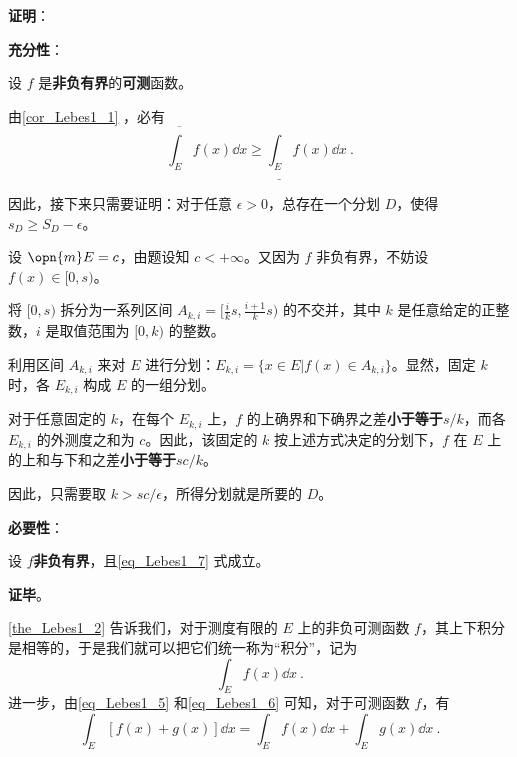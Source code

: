 \textbf{证明}：

\textbf{充分性}：

设 $f$ 是\textbf{非负有界}的\textbf{可测}函数。

由\autoref{cor_Lebes1_1} ，必有
\begin{equation}
\overline{\int_E} f(x) \dd x \geq \underline{\int_E} f(x) \dd x~.
\end{equation}

因此，接下来只需要证明：对于任意 $\epsilon>0$，总存在一个分划 $D$，使得 $s_D\geq S_D-\epsilon$。

设 $\opn{m}E=c$，由题设知 $c<+\infty$。又因为 $f$ 非负有界，不妨设 $f(x)\in [0, s)$。

将 $[0, s)$ 拆分为一系列区间 $A_{k, i}=[\frac{i}{k}s, \frac{i+1}{k}s)$ 的不交并，其中 $k$ 是任意给定的正整数，$i$ 是取值范围为 $[0, k)$ 的整数。

利用区间 $A_{k, i}$ 来对 $E$ 进行分划：$E_{k, i}=\{x\in E|f(x)\in A_{k, i}\}$。显然，固定 $k$ 时，各 $E_{k, i}$ 构成 $E$ 的一组分划。

对于任意固定的 $k$，在每个 $E_{k, i}$ 上，$f$ 的上确界和下确界之差\textbf{小于等于}$s/k$，而各 $E_{k, i}$ 的外测度之和为 $c$。因此，该固定的 $k$ 按上述方式决定的分划下，$f$ 在 $E$ 上的上和与下和之差\textbf{小于等于}$sc/k$。

因此，只需要取 $k>sc/\epsilon$，所得分划就是所要的 $D$。

\textbf{必要性}：

设 $f$\textbf{非负有界}，且\autoref{eq_Lebes1_7} 式成立。




\textbf{证毕}。



\autoref{the_Lebes1_2} 告诉我们，对于测度有限的 $E$ 上的非负可测函数 $f$，其上下积分是相等的，于是我们就可以把它们统一称为“积分”，记为
\begin{equation}
\int_E f(x) \dd x~.
\end{equation}
进一步，由\autoref{eq_Lebes1_5} 和\autoref{eq_Lebes1_6} 可知，对于可测函数 $f$，有
\begin{equation}
\int_E [f(x)+g(x)] \dd x=\int_E f(x) \dd x+\int_E g(x) \dd x~.
\end{equation}






